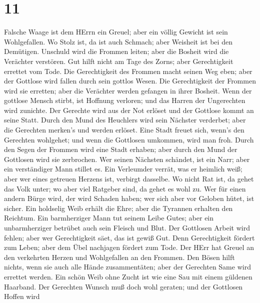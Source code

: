 \hypertarget{section-10}{%
\section{11}\label{section-10}}

 Falsche Waage ist dem HErrn ein Greuel; aber ein völlig
Gewicht ist sein Wohlgefallen.  Wo Stolz ist, da ist auch
Schmach; aber Weisheit ist bei den Demütigen.  Unschuld wird
die Frommen leiten; aber die Bosheit wird die Verächter verstören.
 Gut hilft nicht am Tage des Zorns; aber Gerechtigkeit
errettet vom Tode.  Die Gerechtigkeit des Frommen macht
seinen Weg eben; aber der Gottlose wird fallen durch sein gottlos Wesen.
 Die Gerechtigkeit der Frommen wird sie erretten; aber die
Verächter werden gefangen in ihrer Bosheit.  Wenn der
gottlose Mensch stirbt, ist Hoffnung verloren; und das Harren der
Ungerechten wird zunichte.  Der Gerechte wird aus der Not
erlöset und der Gottlose kommt an seine Statt.  Durch den
Mund des Heuchlers wird sein Nächster verderbet; aber die Gerechten
merken's und werden erlöset.  Eine Stadt freuet sich,
wenn's den Gerechten wohlgehet; und wenn die Gottlosen umkommen, wird
man froh.  Durch den Segen der Frommen wird eine Stadt
erhaben; aber durch den Mund der Gottlosen wird sie zerbrochen.
 Wer seinen Nächsten schändet, ist ein Narr; aber ein
verständiger Mann stillet es.  Ein Verleumder verrät, was
er heimlich weiß; aber wer eines getreuen Herzens ist, verbirgt
dasselbe.  Wo nicht Rat ist, da gehet das Volk unter; wo
aber viel Ratgeber sind, da gehet es wohl zu.  Wer für
einen andern Bürge wird, der wird Schaden haben; wer sich aber vor
Geloben hütet, ist sicher.  Ein holdselig Weib erhält die
Ehre; aber die Tyrannen erhalten den Reichtum.  Ein
barmherziger Mann tut seinem Leibe Gutes; aber ein unbarmherziger
betrübet auch sein Fleisch und Blut.  Der Gottlosen Arbeit
wird fehlen; aber wer Gerechtigkeit säet, das ist gewiß Gut.
 Denn Gerechtigkeit fördert zum Leben; aber dem Übel
nachjagen fördert zum Tode.  Der HErr hat Greuel an den
verkehrten Herzen und Wohlgefallen an den Frommen.  Den
Bösen hilft nichts, wenn sie auch alle Hände zusammentäten; aber der
Gerechten Same wird errettet werden.  Ein schön Weib ohne
Zucht ist wie eine Sau mit einem güldenen Haarband.  Der
Gerechten Wunsch muß doch wohl geraten; und der Gottlosen Hoffen wird
